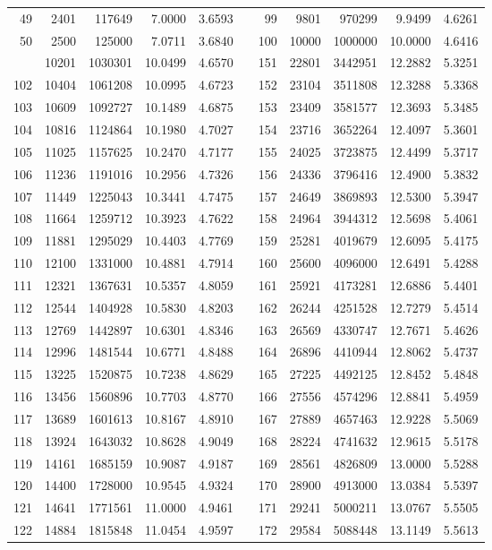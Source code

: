 \begin{longtable}{rrrrrrrrrrr}
49&2401&117649&7.0000&3.6593&&99&9801&970299&9.9499&4.6261\\
50&2500&125000&7.0711&3.6840&&100&10000&1000000&10.0000&4.6416\\
\newpage
101&10201&1030301&10.0499&4.6570&&151&22801&3442951&12.2882&5.3251\\
102&10404&1061208&10.0995&4.6723&&152&23104&3511808&12.3288&5.3368\\
103&10609&1092727&10.1489&4.6875&&153&23409&3581577&12.3693&5.3485\\
104&10816&1124864&10.1980&4.7027&&154&23716&3652264&12.4097&5.3601\\
105&11025&1157625&10.2470&4.7177&&155&24025&3723875&12.4499&5.3717\\
106&11236&1191016&10.2956&4.7326&&156&24336&3796416&12.4900&5.3832\\
107&11449&1225043&10.3441&4.7475&&157&24649&3869893&12.5300&5.3947\\
108&11664&1259712&10.3923&4.7622&&158&24964&3944312&12.5698&5.4061\\
109&11881&1295029&10.4403&4.7769&&159&25281&4019679&12.6095&5.4175\\
110&12100&1331000&10.4881&4.7914&&160&25600&4096000&12.6491&5.4288\\
111&12321&1367631&10.5357&4.8059&&161&25921&4173281&12.6886&5.4401\\
112&12544&1404928&10.5830&4.8203&&162&26244&4251528&12.7279&5.4514\\
113&12769&1442897&10.6301&4.8346&&163&26569&4330747&12.7671&5.4626\\
114&12996&1481544&10.6771&4.8488&&164&26896&4410944&12.8062&5.4737\\
115&13225&1520875&10.7238&4.8629&&165&27225&4492125&12.8452&5.4848\\
116&13456&1560896&10.7703&4.8770&&166&27556&4574296&12.8841&5.4959\\
117&13689&1601613&10.8167&4.8910&&167&27889&4657463&12.9228&5.5069\\
118&13924&1643032&10.8628&4.9049&&168&28224&4741632&12.9615&5.5178\\
119&14161&1685159&10.9087&4.9187&&169&28561&4826809&13.0000&5.5288\\
120&14400&1728000&10.9545&4.9324&&170&28900&4913000&13.0384&5.5397\\
121&14641&1771561&11.0000&4.9461&&171&29241&5000211&13.0767&5.5505\\
122&14884&1815848&11.0454&4.9597&&172&29584&5088448&13.1149&5.5613\\

\end{longtable}
